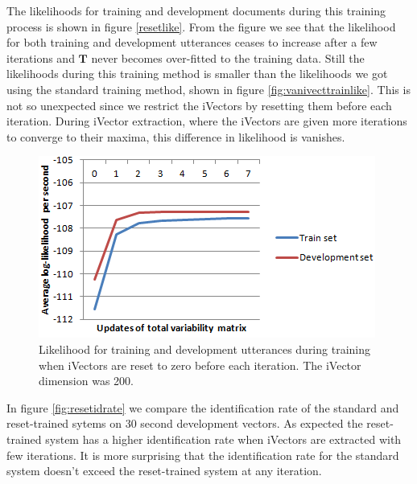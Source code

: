 The likelihoods for training and development documents during this training process is shown in figure \ref{resetlike}. From the figure we see that the likelihood for both training and development utterances ceases to increase after a few iterations and $\mathbf{T}$ never becomes over-fitted to the training data. Still the likelihoods during this training method is smaller than the likelihoods we got using the standard training method, shown in figure \ref{fig:vanivecttrainlike}. This is not so unexpected since we restrict the iVectors by resetting them before each iteration. During iVector extraction, where the iVectors are given more iterations to converge to their maxima, this difference in likelihood is vanishes. 
\begin{figure}[hbt]
	\begin{center}
	\includegraphics{figures/resetlike.png}
	\caption{Likelihood for training and development utterances during training when iVectors are reset to zero before each iteration. The iVector dimension was 200.}
	\label{fig:resetlike}
	\end{center}
\end{figure}

In figure \ref{fig:resetidrate} we compare the identification rate of the standard and reset-trained sytems on 30 second development vectors. As expected the reset-trained system has a higher identification rate when iVectors are extracted with few iterations. It is more surprising that the identification rate for the standard system doesn't exceed the reset-trained system at any iteration.


